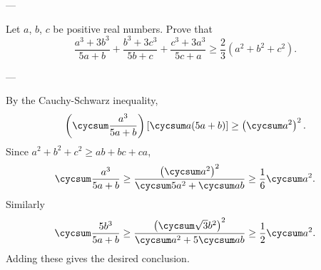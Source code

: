 
---

Let $a$, $b$, $c$ be positive real numbers. Prove that \[\frac{a^3+3b^3}{5a+b}+\frac{b^3+3c^3}{5b+c}+\frac{c^3+3a^3}{5c+a}\ge\frac23\left(a^2+b^2+c^2\right).\]

---

By the Cauchy-Schwarz inequality, \[\left(\cycsum\frac{a^3}{5a+b}\right)\left[\cycsum a(5a+b)\right]\ge\left(\cycsum a^2\right)^2.\]
Since $a^2+b^2+c^2\ge ab+bc+ca$, \[\cycsum\frac{a^3}{5a+b}\ge\frac{\left(\cycsum a^2\right)^2}{\cycsum5a^2+\cycsum ab}\ge\frac16\cycsum a^2.\]
Similarly \[\cycsum\frac{5b^3}{5a+b}\ge\frac{\left(\cycsum\sqrt3b^2\right)^2}{\cycsum a^2+5\cycsum ab}\ge\frac12\cycsum a^2.\]
Adding these gives the  desired conclusion.
